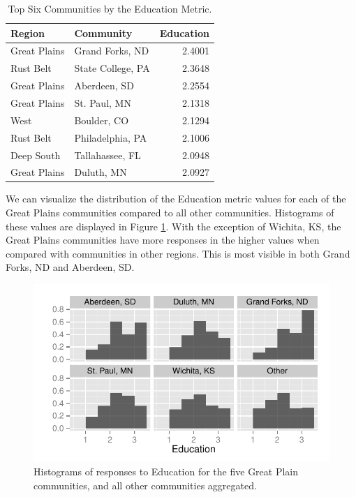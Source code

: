 \documentclass[11pt]{article}\usepackage{knitr}
\begin{document}
\begin{table}[ht]
\centering
\begin{tabular}{llr}
  \hline
Region & Community & Education \\ 
  \hline
Great Plains & Grand Forks, ND & 2.4001 \\ 
  Rust Belt & State College, PA & 2.3648 \\ 
  Great Plains & Aberdeen, SD & 2.2554 \\ 
  Great Plains & St. Paul, MN & 2.1318 \\ 
  West & Boulder, CO & 2.1294 \\ 
  Rust Belt & Philadelphia, PA & 2.1006 \\ 
  Deep South & Tallahassee, FL & 2.0948 \\ 
  Great Plains & Duluth, MN & 2.0927 \\ 
   \hline
\end{tabular}
\caption{Top Six Communities by the Education Metric.} 
\label{tbl:edu_table}
\end{table}



We can visualize the distribution of the Education metric values for each of the Great Plains communities compared to all other communities. Histograms of these values are displayed in Figure \ref{fig:gp_one}. With the exception of Wichita, KS, the Great Plains communities have more responses in the higher values when compared with communities in other regions. This is most visible in both Grand Forks, ND and Aberdeen, SD.

\begin{knitrout}
\color{fgcolor}\begin{figure}[H]


{\centering \includegraphics[width=\maxwidth]{figure/gp_one} 

}

\caption[Histograms of responses to Education for the five Great Plain communities, and all other communities aggregated]{Histograms of responses to Education for the five Great Plain communities, and all other communities aggregated.\label{fig:gp_one}}
\end{figure}


\end{knitrout}
\end{document}
